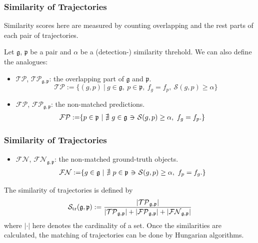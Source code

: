 \documentclass[slidetop, mathserif]{beamer}
\newcommand{\suchthat}{-\hspace{-10pt}\ni\hspace{-10pt}-}
\begin{document}
\begin{frame}
	\frametitle{Similarity of Trajectories}
			
	Similarity scores here are measured
	by counting overlapping and the rest parts of each pair of trajectories.
			
	\vspace{5pt}
			
	Let $\mathfrak g$, $\mathfrak p$ be a pair
	and $\alpha$ be a (detection-) similarity threhold.
	We can also define the analogues:
	\begin{itemize}
		\item $\mathcal{TP}$, $\mathcal{TP}_{\mathfrak g, \mathfrak p}$:
		      the overlapping part of $\mathfrak g$ and $\mathfrak p$.
		      \[
		      	\mathcal{TP} := \{(g,p)\ |\ 
		      	g\in\mathfrak g,~
		      	p\in\mathfrak p,~
		      	f_g=f_p,~ \mathcal S(g,p)\geq \alpha\}
		      \]
		\item $\mathcal{FP}$, $\mathcal{FP}_{\mathfrak g, \mathfrak p}$:
		      the non-matched predictions.
		      \begin{align*}
		      	\mathcal{FP} := & \{ p\in\mathfrak p\ |\ 
		      	\nexists\ g\in\mathfrak g ~\suchthat~ \mathcal S(g,p)\geq\alpha,~ f_g=f_p.\}
		      \end{align*}
	\end{itemize}
			
\end{frame}

\begin{frame}
	\frametitle{Similarity of Trajectories}
			
	\begin{itemize}
		\item $\mathcal{FN}$, $\mathcal{FN}_{\mathfrak g, \mathfrak p}$: the non-matched ground-truth objects.
		      \begin{align*}
		      	\mathcal{FN} := & \{ g\in\mathfrak g\ |\ 
		      	\nexists\ p\in\mathfrak p ~\suchthat~ \mathcal S(g,p)\geq\alpha,~ f_p=f_g.\}
		      \end{align*}
	\end{itemize}
			
	The similarity of trajectories is defined by
	\[
		\mathcal S_{\rm tr}(\mathfrak g, \mathfrak p) :=
		\dfrac{|\mathcal{TP}_{\mathfrak g,\mathfrak p}|}{
			|\mathcal{TP}_{\mathfrak g,\mathfrak p}|+|\mathcal{FP}_{\mathfrak g,\mathfrak p}|+|\mathcal{FN}_{\mathfrak g,\mathfrak p}|
		}
	\]
	where $|\cdot|$ here denotes the cardinality of a set.
	Once the similarities are calculated,
	the matching of trajectories can be done by Hungarian algorithms.
\end{frame}
\end{document}
